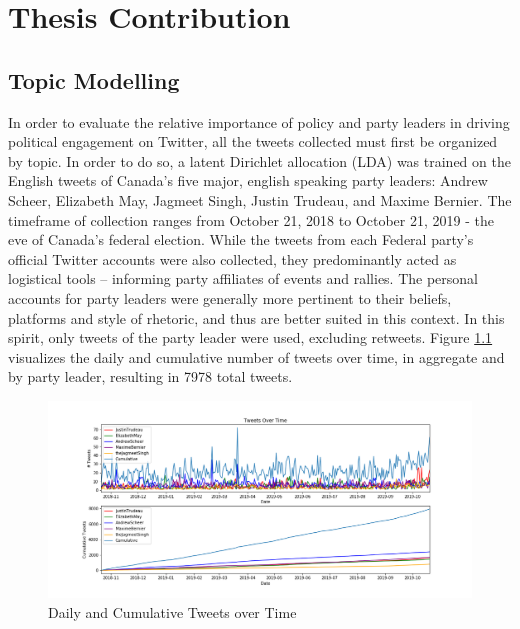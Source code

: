 \chapter{Thesis Contribution}\label{ch:ThesisCont}
      
\section{Topic Modelling}\label{sec:TopicModelling}

In order to evaluate the relative importance of policy and party leaders in
driving political engagement on Twitter, all the tweets collected must first be
organized by topic. In order to do so, a latent Dirichlet allocation (LDA) was
trained on the English tweets of Canada's five major, english speaking party
leaders: Andrew Scheer, Elizabeth May, Jagmeet Singh, Justin Trudeau, and Maxime
Bernier. The timeframe of collection ranges from October 21, 2018 to October 21,
2019 - the eve of Canada's federal election. While the tweets from each Federal
party's official Twitter accounts were also collected, they predominantly acted
as logistical tools -- informing party affiliates of events and rallies. The
personal accounts for party leaders were generally more pertinent to their
beliefs, platforms and style of rhetoric, and thus are better suited in this
context. In this spirit, only tweets of the party leader were used, excluding
retweets. Figure \ref{fig:tweets_over_time} visualizes the daily and cumulative
number of tweets over time, in aggregate and by party leader, resulting in 7978
total tweets.

\begin{singlespacing}
    \begin{figure}[H]
    \centering
    \includegraphics[scale=0.40]{Figures/tweets_over_time}
    \caption[Daily and Cumulative Tweets over Time]{Daily and Cumulative Tweets over Time}
    \label{fig:tweets_over_time}
    \end{figure}
\end{singlespacing}

